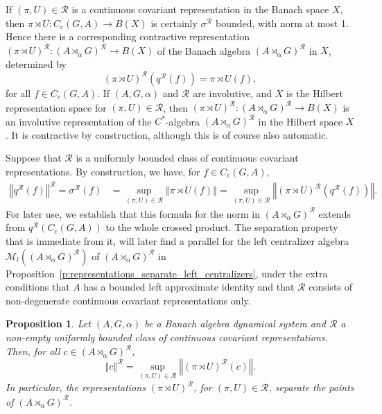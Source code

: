 \documentclass{amsart}
\theoremstyle{plain}
\newtheorem{prop}[theorem]{Proposition}
\theoremstyle{definition}
\numberwithin{equation}{section}
\begin{document}
If ${(\pi,U)}\in\mathcal R$ is a continuous covariant representation in the Banach space $X$, then ${\pi \rtimes U} : C_c(G,A) \to B(X)$ is certainly ${\sigma^{\mathcal R}}$ bounded, with norm at most 1. Hence there is a corresponding contractive representation $({\pi \rtimes U})^{\mathcal R}: {(A {\rtimes}_\alpha G)^\mathcal{R}} \to B(X)$ of the Banach algebra ${(A {\rtimes}_\alpha G)^\mathcal{R}}$ in $X$, determined by
\begin{equation}\label{e:intformr_definition}
({\pi \rtimes U})^{\mathcal R}({q^{\mathcal R}}(f)) = {\pi \rtimes U}(f),
\end{equation}
for all $f\in C_c(G,A)$. If ${(A,G,\alpha)}$ and ${\mathcal R}$ are involutive, and $X$ is the Hilbert representation space for ${(\pi,U)}\in{\mathcal R}$, then $({\pi \rtimes U})^{\mathcal R} : {(A {\rtimes}_\alpha G)^\mathcal{R}} \to B(X)$ is an involutive representation of the $C^*$-algebra ${(A {\rtimes}_\alpha G)^\mathcal{R}}$ in the Hilbert space $X$. It is contractive by construction, although this is of course also automatic.

Suppose that ${\mathcal R}$ is a uniformly bounded class of continuous covariant representations. By construction, we have, for $f\in C_c(G,A)$,
\begin{align*}
{\left\Vert {{q^{\mathcal R}}(f)} \right\Vert^{\mathcal R}} = {\sigma^{\mathcal R}}(f) &= \sup_{{(\pi,U)} \in \mathcal{R}} {\left\Vert {{\pi \rtimes U} (f)} \right\Vert} = \sup_{{(\pi,U)} \in \mathcal{R}} {\left\Vert {({\pi \rtimes U})^{\mathcal R} ({q^{\mathcal R}}(f))} \right\Vert}.
\end{align*}
For later use, we establish that this formula for the norm in ${(A {\rtimes}_\alpha G)^\mathcal{R}}$ extends from ${q^{\mathcal R}}(C_c(G,A))$ to the whole crossed product. The separation property that is immediate from it, will later find a parallel for the left centralizer algebra $\mathcal M_l({(A {\rtimes}_\alpha G)^\mathcal{R}})$ of ${(A {\rtimes}_\alpha G)^\mathcal{R}}$ in Proposition~\ref{p:representations_separate_left_centralizers}, under the extra conditions that $A$ has a bounded left approximate identity and that ${\mathcal R}$ consists of non-degenerate continuous covariant representations only.

\begin{prop}\label{p:norm_formula_in_crossed_product}
Let ${(A,G,\alpha)}$ be a Banach algebra dynamical system and $\mathcal R$ a non-empty uniformly bounded class of continuous covariant representations. Then, for all $c \in {(A {\rtimes}_\alpha G)^\mathcal{R}}$,
\[
{\left\Vert {c} \right\Vert^{\mathcal R}}=\sup_{{(\pi,U)} \in \mathcal{R}} {\left\Vert {({\pi \rtimes U})^{\mathcal R} (c)} \right\Vert}.
\]
In particular, the representations $({\pi \rtimes U})^{\mathcal R}$, for ${(\pi,U)}\in\mathcal R$, separate the points of ${(A {\rtimes}_\alpha G)^\mathcal{R}}$.
\end{prop}
\end{document}
